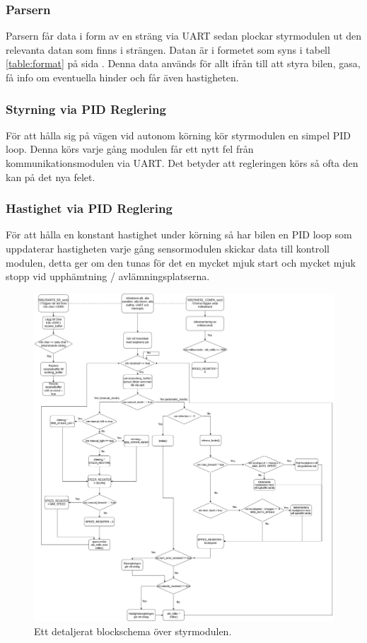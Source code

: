 \documentclass[10pt,oneside,swedish]{lips}
\begin{document}
\subsubsection{Parsern}
Parsern får data i form av en sträng via UART sedan plockar styrmodulen ut den relevanta datan som finns i strängen. Datan är i formetet som syns i tabell \ref{table:format} på sida \pageref{table:format}. Denna data används för allt ifrån till att styra bilen, gasa, få info om eventuella hinder och får även hastigheten.

\subsubsection{Styrning via PID Reglering}
För att hålla sig på vägen vid autonom körning kör styrmodulen en simpel PID loop. Denna körs varje gång modulen får ett nytt fel från kommunikationsmodulen via UART. Det betyder att regleringen körs så ofta den kan på det nya felet.

\subsubsection{Hastighet via PID Reglering}
För att hålla en konstant hastighet under körning så har bilen en PID loop som uppdaterar hastigheten varje gång sensormodulen skickar data till kontroll modulen, detta ger om den tunas för det en mycket mjuk start och mycket mjuk stopp vid upphämtning / avlämningsplatserna.

\begin{figure}[H]
  \centering
  \includegraphics[width=1\textwidth]{./Figures/ControlModule_blockschema.png}
  \caption{Ett detaljerat blockschema över styrmodulen.}
  \label{fig:Grafen_noderna.png}
\end{figure}
\end{document}
